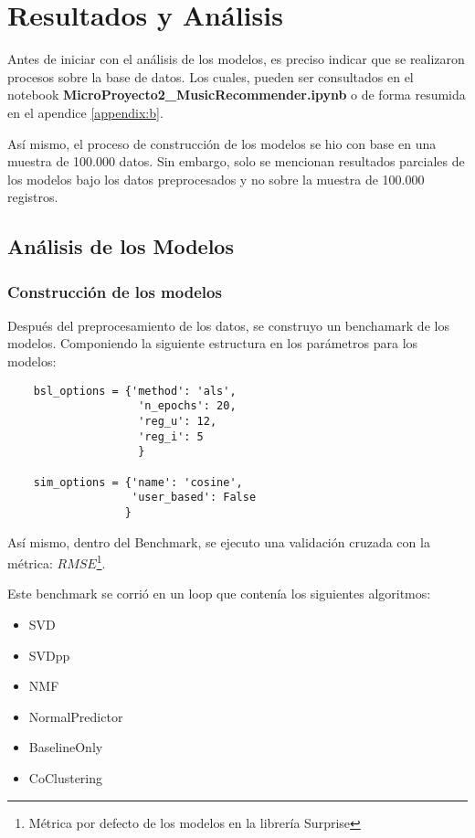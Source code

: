 \documentclass{article}
\begin{document}
\section{Resultados y Análisis}

Antes de iniciar con el análisis de los modelos, es preciso indicar que se realizaron procesos sobre la base de datos. Los cuales, pueden ser consultados en el notebook \textbf{MicroProyecto2\_MusicRecommender.ipynb} o de forma resumida en el apendice \ref{appendix:b}. %

Así mismo, el proceso de construcción de los modelos se hio con base en una muestra de 100.000 datos. Sin embargo, solo se mencionan resultados parciales de los modelos bajo los datos preprocesados  y no sobre la muestra de 100.000 registros.

\subsection{Análisis de los Modelos}
\subsubsection{Construcción de los modelos}

Después del preprocesamiento de los datos, se construyo un benchamark de los modelos. Componiendo la siguiente estructura en los parámetros para los modelos:

\begin{verbatim}
    bsl_options = {'method': 'als',
                    'n_epochs': 20,
                    'reg_u': 12, 
                    'reg_i': 5  
                    }

    sim_options = {'name': 'cosine',
                   'user_based': False
                  }
\end{verbatim}

Así mismo, dentro del Benchmark, se ejecuto una validación cruzada con la métrica: $RMSE$\footnote{Métrica por defecto de los modelos en la librería Surprise}.

Este benchmark se corrió en un loop que contenía los siguientes algoritmos:

\begin{itemize}
    \item SVD
    \item SVDpp
    \item NMF
    \item NormalPredictor
    \item BaselineOnly
    \item CoClustering
\end{itemize}
\end{document}
